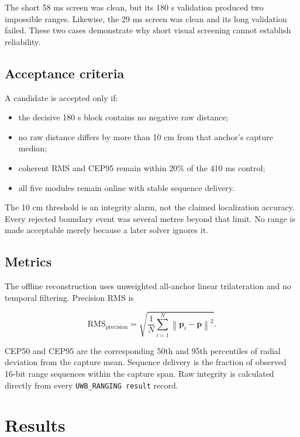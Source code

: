 \documentclass[11pt,a4paper]{article}
\begin{document}
The short 58 ms screen was clean, but its 180 s validation produced two
impossible ranges. Likewise, the 29 ms screen was clean and its long
validation failed. These two cases demonstrate why short visual screening
cannot establish reliability.

\subsection{Acceptance criteria}

A candidate is accepted only if:

\begin{itemize}[leftmargin=7mm]
  \item the decisive 180 s block contains no negative raw distance;
  \item no raw distance differs by more than 10 cm from that anchor's capture
  median;
  \item coherent RMS and CEP95 remain within 20\% of the 410 ms control;
  \item all five modules remain online with stable sequence delivery.
\end{itemize}

The 10 cm threshold is an integrity alarm, not the claimed localization
accuracy. Every rejected boundary event was several metres beyond that limit.
No range is made acceptable merely because a later solver ignores it.

\subsection{Metrics}

The offline reconstruction uses unweighted all-anchor linear trilateration and
no temporal filtering. Precision RMS is

\begin{equation}
  \mathrm{RMS}_{\mathrm{precision}} =
  \sqrt{\frac{1}{N}\sum_{i=1}^{N}
  \left\lVert \mathbf{p}_i-\overline{\mathbf{p}}\right\rVert^2}.
\end{equation}

CEP50 and CEP95 are the corresponding 50th and 95th percentiles of radial
deviation from the capture mean. Sequence delivery is the fraction of observed
16-bit range sequences within the capture span. Raw integrity is calculated
directly from every \texttt{UWB\_RANGING result} record.

\section{Results}
\end{document}
